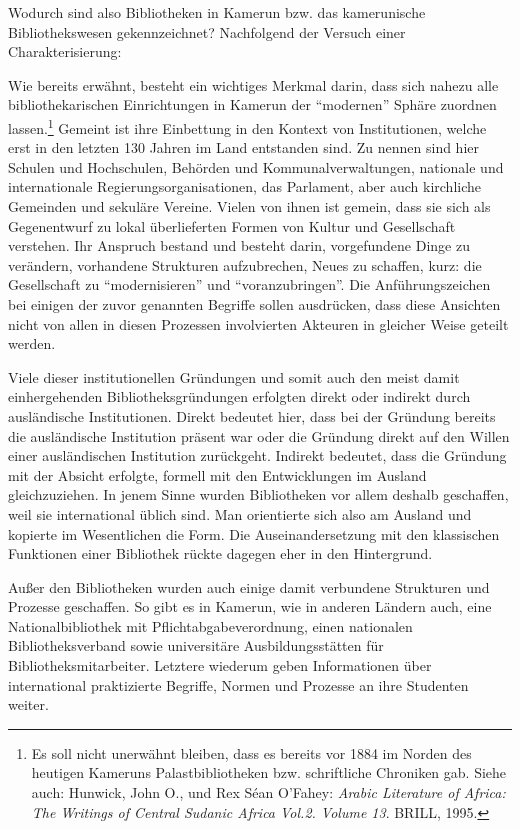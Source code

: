 \documentclass[a4paper,
fontsize=11pt,
oneside,
numbers=noperiodatend,
parskip=half-,
bibliography=totoc,
final
]{scrartcl}
\begin{document}
Wodurch sind also Bibliotheken in Kamerun bzw. das kamerunische
Bibliothekswesen gekennzeichnet? Nachfolgend der Versuch einer
Charakterisierung:

Wie bereits erwähnt, besteht ein wichtiges Merkmal darin, dass sich
nahezu alle bibliothekarischen Einrichtungen in Kamerun der
\enquote{modernen} Sphäre zuordnen lassen.\footnote{Es soll nicht
  unerwähnt bleiben, dass es bereits vor 1884 im Norden des heutigen
  Kameruns Palastbibliotheken bzw. schriftliche Chroniken gab. Siehe
  auch: Hunwick, John O., und Rex Séan O'Fahey: \emph{Arabic Literature
  of Africa: The Writings of Central Sudanic Africa Vol.2. Volume 13}.
  BRILL, 1995.} Gemeint ist ihre Einbettung in den Kontext von
Institutionen, welche erst in den letzten 130 Jahren im Land entstanden
sind. Zu nennen sind hier Schulen und Hochschulen, Behörden und
Kommunalverwaltungen, nationale und internationale
Regierungsorganisationen, das Parlament, aber auch kirchliche Gemeinden
und sekuläre Vereine. Vielen von ihnen ist gemein, dass sie sich als
Gegenentwurf zu lokal überlieferten Formen von Kultur und Gesellschaft
verstehen. Ihr Anspruch bestand und besteht darin, vorgefundene Dinge zu
verändern, vorhandene Strukturen aufzubrechen, Neues zu schaffen, kurz:
die Gesellschaft zu \enquote{modernisieren} und
\enquote{voranzubringen}. Die Anführungszeichen bei einigen der zuvor
genannten Begriffe sollen ausdrücken, dass diese Ansichten nicht von
allen in diesen Prozessen involvierten Akteuren in gleicher Weise
geteilt werden.

Viele dieser institutionellen Gründungen und somit auch den meist damit
einhergehenden Bibliotheksgründungen erfolgten direkt oder indirekt
durch ausländische Institutionen. Direkt bedeutet hier, dass bei der
Gründung bereits die ausländische Institution präsent war oder die
Gründung direkt auf den Willen einer ausländischen Institution
zurückgeht. Indirekt bedeutet, dass die Gründung mit der Absicht
erfolgte, formell mit den Entwicklungen im Ausland gleichzuziehen. In
jenem Sinne wurden Bibliotheken vor allem deshalb geschaffen, weil sie
international üblich sind. Man orientierte sich also am Ausland und
kopierte im Wesentlichen die Form. Die Auseinandersetzung mit den
klassischen Funktionen einer Bibliothek rückte dagegen eher in den
Hintergrund.

Außer den Bibliotheken wurden auch einige damit verbundene Strukturen
und Prozesse geschaffen. So gibt es in Kamerun, wie in anderen Ländern
auch, eine Nationalbibliothek mit Pflichtabgabeverordnung, einen
nationalen Bibliotheksverband sowie universitäre Ausbildungsstätten für
Bibliotheksmitarbeiter. Letztere wiederum geben Informationen über
international praktizierte Begriffe, Normen und Prozesse an ihre
Studenten weiter.
\end{document}
